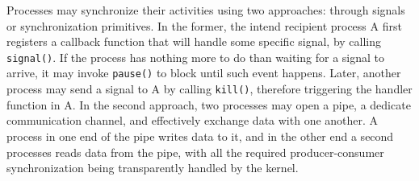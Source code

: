 \documentclass[10pt,a4paper]{article}
\begin{document}
Processes may synchronize their activities using two approaches: through signals or synchronization primitives. In the former, the intend recipient process A first registers a callback function that will handle some specific signal, by calling \texttt{signal()}. If the process has nothing more to do than waiting for a signal to arrive, it may invoke \texttt{pause()} to block until such event happens. Later, another process may send a signal to A by calling \texttt{kill()}, therefore triggering the handler function in A. In the second approach, two processes may open a pipe, a dedicate communication channel, and effectively exchange data with one another. A process in one end of the pipe writes data to it, and in the other end a second processes reads data from the pipe, with all the required producer-consumer synchronization being transparently handled by the kernel.
\end{document}
